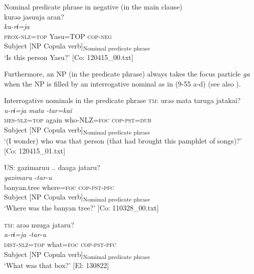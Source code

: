 \ea   Nominal predicate phrase in negative (in the main clause) \label{ex:9.54}\\
 \gllll  kurəə  jasuuja  aran?\\
    \textit{ku-rɨ=ja}  \textit{}  \textit{}\\
    \textsc{prox}-\textsc{nlz}=\textsc{top}  Yasu=TOP  \textsc{cop}-\textsc{neg}\\
    Subject  [NP  {Copula verb]\textsubscript{Nomimal predicate phrase}}\\
    \glt     ‘Is this person Yasu?’ [Co: 120415\_00.txt]
\z

Furthermore, an NP (in the predicate phrase) always takes the focus particle \textit{ga} when the NP is filled by an interrogative nominal as in (9-55 a-d) (see also ).

\ea   Interrogative nominals in the predicate phrase  \label{ex:9.55}
\ea \textsc{tm}:
 \gllll  urəə  mata  taruga  jatakai?\\
      \textit{u-rɨ=ja}  \textit{mata}  \textit{}  \textit{-tar=kai}\\
      \textsc{mes}-\textsc{nlz}=\textsc{top}  again  who-NLZ=\textsc{foc}  \textsc{cop}-\textsc{pst}=\textsc{dub}\\
      Subject    [NP  {Copula verb]\textsubscript{Nomimal predicate phrase}}\\
      \glt       ‘(I wonder) who was that person (that had brought this pamphlet of songs)?’ [Co: 120415\_01.txt]

\ex \label{ex:9.55b} US: \gllll    gazimaruu  ..  daaga  jataru?\\
      \textit{gazimaru}  {}  \textit{}  \textit{-tar-u}\\
      banyan.tree  {}  where=\textsc{foc}  \textsc{cop}-\textsc{pst}-\textsc{pfc}\\
      Subject  {}  [NP  {Copula verb]\textsubscript{Nomimal predicate phrase}}\\
      \glt       ‘Where was the banyan tree?’ [Co: 110328\_00.txt]

\ex \label{ex:9.55c} \textsc{tm}:
    \gllll  arəə  nuuga  jataru?\\
      \textit{a-rɨ=ja}  \textit{}  \textit{-tar-u}\\
      \textsc{dist}-\textsc{nlz}=\textsc{top}  what=\textsc{foc}  \textsc{cop}-\textsc{pst}-\textsc{pfc}\\
      Subject  [NP  {Copula verb]\textsubscript{Nomimal predicate phrase}}\\
      \glt       ‘What was that box?’ [El: 130822]

